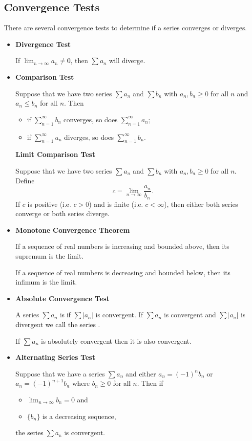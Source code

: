 \subsection{Convergence Tests}
There are several convergence tests to determine if a series converges or diverges.

\begin{itemize}
\item \textbf{Divergence Test}

If $\lim_{n\to\infty}a_n\neq0$, then $\sum a_n$ will diverge.

\item \textbf{Comparison Test}

Suppose that we have two series $\sum a_n$ and $\sum b_n$ with $a_n,b_n\ge0$ for all $n$ and $a_n\le b_n$ for all $n$. Then
\begin{itemize}
\item if $\sum_{n=1}^\infty b_n$ converges, so does $\sum_{n=1}^\infty a_n$;
\item if $\sum_{n=1}^\infty a_n$ diverges, so does $\sum_{n=1}^\infty b_n$.
\end{itemize}

\textbf{Limit Comparison Test}

Suppose that we have two series $\sum a_n$ and $\sum b_n$ with $a_n,b_n\ge0$ for all $n$. Define
\[ c=\lim_{n\to\infty}\frac{a_n}{b_n}. \]
If $c$ is positive (i.e. $c>0$) and is finite (i.e. $c<\infty$), then either both series converge or both series diverge.

\item \textbf{Monotone Convergence Theorem}

If a sequence of real numbers is increasing and bounded above, then its supremum is the limit.

If a sequence of real numbers is decreasing and bounded below, then its infimum is the limit.

\item \textbf{Absolute Convergence Test}

A series $\sum a_n$ is  if $\sum|a_n|$ is convergent. If $\sum a_n$ is convergent and $\sum|a_n|$ is divergent we call the series .

If $\sum a_n$ is absolutely convergent then it is also convergent.

\item \textbf{Alternating Series Test}

Suppose that we have a series $\sum a_n$ and either $a_n=(-1)^nb_n$ or $a_n=(-1)^{n+1}b_n$ where $b_n\ge0$ for all $n$. Then if
\begin{itemize}
\item $\lim_{n\to\infty}b_n=0$ and
\item $\{b_n\}$ is a decreasing sequence,
\end{itemize}
the series $\sum a_n$ is convergent.


\end{itemize}
